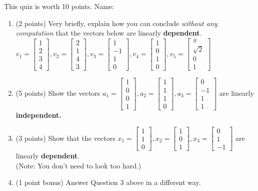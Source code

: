 \documentclass[11pt,fleqn]{article}
\def\vecthree#1#2#3{\begin{bmatrix}#1\\#2\\#3\end{bmatrix}}
\def\vecfour#1#2#3#4{\begin{bmatrix}#1\\#2\\#3\\#4\end{bmatrix}}
\begin{document}
\renewcommand{\headrulewidth}{0pt}
\newcommand{\blank}[1]{\rule{#1}{0.75pt}}
\renewcommand{\d}{\displaystyle}
This quiz is worth 10 points. \hfill {\Large{Name: \underline{\hspace{2in}}}}
\begin{enumerate}
\item (2 points) Very briefly, explain how you can conclude \emph{without any computation} that the vectors below are linearly \textbf{dependent}. \\


 $v_1=\vecfour 1 2 3 4, v_2=\vecfour 2 1 4 3, v_3=\vecfour1 {-1} 1 0,  v_4=\vecfour 1 0 1 0, v_5=\vecfour {\pi} {\sqrt{2}} 0 1$
 
\vspace{.8in}

\item (5 points) Show the vectors $a_1=\vecfour 1 0 0 1, a_2=\vecfour 1 1 1 0, a_3=\vecfour 0 {-1} 1 1$ are linearly \textbf{independent.}

 
\newpage
\item (3 points) Show that the vectors $x_1=\vecthree 1 1 0, x_2=\vecthree 1 0 1, x_3= \vecthree 0 1 {-1}$ are linearly \textbf{dependent}. \\

(Note: You don't need to look too hard.)

\vfill
\item (1 point bonus) Answer Question 3 above in a different way. 
\vfill
\end{enumerate}
\end{document}
